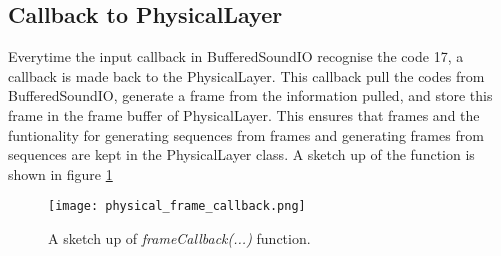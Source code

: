	\subsection{Callback to PhysicalLayer}
	Everytime the input callback in BufferedSoundIO recognise the code 17, a callback is made back to the PhysicalLayer. This callback pull the
	codes from BufferedSoundIO, generate a frame from the information pulled, and store this frame in the frame buffer of PhysicalLayer. This ensures
	that frames and the funtionality for generating sequences from frames and generating frames from sequences are kept in the PhysicalLayer class.
	A sketch up of the function is shown in figure \ref{fig:physical_frame_callback}
	
	\begin{figure}[htb]
		\begin{center}
		\texttt{[image: physical\_frame\_callback.png]}%
		\caption{A sketch up of \textit{frameCallback(...)} function.}
		\label{fig:physical_frame_callback}
		\end{center}
	\end{figure}
